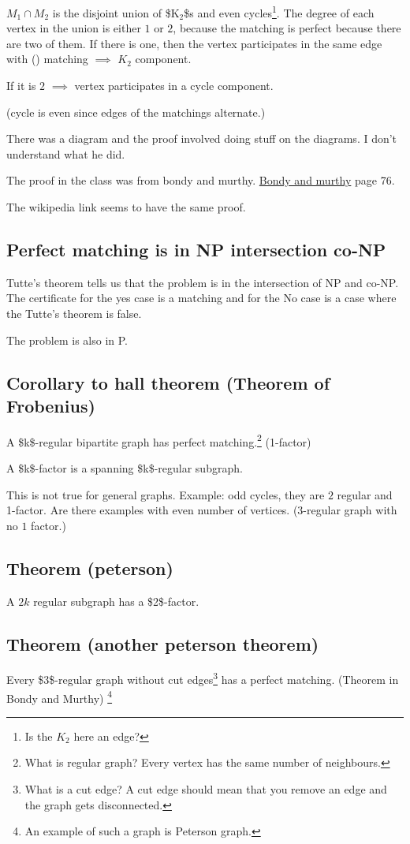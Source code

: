 \documentclass[11pt]{article}
\begin{document}
\(M_1 \cap M_2\) is the disjoint union of \$K\(_{\text{2}}\)\$s and even cycles\footnote{Is the \(K_2\) here an edge?}. The degree
of each vertex in the union is either \(1\) or \(2\), because the matching is
perfect because there are two of them. If there is one, then the vertex
participates in the same edge with () matching \(\implies\) \(K_2\) component.

If it is \(2\) \(\implies\) vertex participates in a cycle component.

(cycle is even since edges of the matchings alternate.)

There was a diagram and the proof involved doing stuff on the diagrams. I
don't understand what he did.

The proof in the class was from bondy and murthy. \href{http://www.zib.de/groetschel/teaching/WS1314/BondyMurtyGTWA.pdf}{Bondy and murthy} page 76. 

The wikipedia link seems to have the same proof.
\subsection{Perfect matching is in NP intersection co-NP}
\label{sec:org13d4ca2}
Tutte's theorem tells us that the problem is in the intersection of NP and
co-NP. The certificate for the yes case is a matching and for the No case is
a case where the Tutte's theorem is false.

The problem is also in P.
\subsection{Corollary to hall theorem (Theorem of Frobenius)}
\label{sec:org96c32c3}
A \$k\$-regular bipartite graph has perfect matching.\footnote{What is regular graph? Every vertex has the same number of neighbours.} (1-factor)

A \$k\$-factor is a spanning \$k\$-regular subgraph. 

This is not true for general graphs. Example: odd cycles, they are \(2\)
regular and 1-factor. Are there examples with even number of vertices.
(3-regular graph with no \(1\) factor.)


\subsection{Theorem (peterson)}
\label{sec:org13edee7}
A \(2k\) regular subgraph has a \$2\$-factor. 
\subsection{Theorem (another peterson theorem)}
\label{sec:org4311f31}
Every \$3\$-regular graph without cut edges\footnote{What is a cut edge? A cut edge should mean that you remove an edge and
the graph gets disconnected.} has a perfect matching. (Theorem in
Bondy and Murthy) \footnote{An example of such a graph is Peterson graph.}
\end{document}
